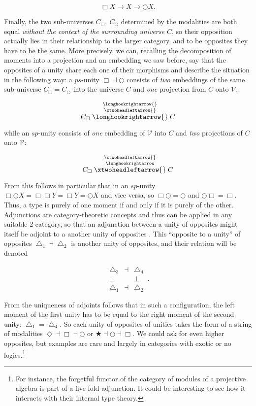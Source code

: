 \documentclass{article}
\begin{document}
$$\Box X\rightarrow X \rightarrow\bigcirc X.$$

Finally, the two sub-universes $C_\Box ,\ C_\bigcirc$ determined by the modalities are both equal \emph{without
the context of the surrounding universe $C$}, so their opposition actually lies in their relationship
to the larger category, and to be opposites they have to be the same. More precisely, we can, recalling
the decomposition of moments into a projection and an embedding we saw before, say that the opposites
of a unity share each one of their morphisms and describe the situation in the following way: a $ps$-unity
$\Box\dashv\bigcirc$ consists of \emph{two} embeddings of the same sub-universe $C_\Box=C_\bigcirc$ into
the universe $C$ and \emph{one} projection from $C$ onto $\mathcal{V}$:

$$C_\Box\stackrel{\longhookrightarrow{}}{\stackrel{\xtwoheadleftarrow{}}{\longhookrightarrow{}}}C$$

while an $sp$-unity consists of \emph{one} embedding of $\mathcal{V}$ into $C$ and \emph{two} projections
of $C$ onto $\mathcal{V}$:

$$C_\Box\stackrel{\xtwoheadleftarrow{}}{\stackrel{\longhookrightarrow}{\xtwoheadleftarrow{}}}C$$

From this follows in particular that in an $sp$-unity $\Box\bigcirc X=\Box\Box Y=\Box Y= \bigcirc X$ and
vice versa, so $\Box\bigcirc=\bigcirc$ and $\bigcirc\Box=\Box$. Thus, a type is purely of one moment if
and only if it is purely of the other. \\

Adjunctions are category-theoretic concepts and thus can be applied in any suitable 2-category, so that
an adjunction between a unity of opposites might itself be adjoint to a another unity of opposites \cite{Shu}.
This ``opposite to a unity'' of opposites $\bigtriangleup_1\dashv\bigtriangleup_2$ is another unity of
opposites, and their relation will be denoted 


$$
  \begin{array}{ccc}
    \bigtriangleup_3 &\dashv& \bigtriangleup_4
    \\
    \bot & & \bot
    \\
    \bigtriangleup_1 &\dashv& \bigtriangleup_2
    \end{array}
  \,.
$$

From the uniqueness of adjoints follows that in such a configuration, the left moment of the first unity
has to be equal to the right moment of the second unity: $\bigtriangleup_1=\bigtriangleup_4$. So each
unity of opposites of unities takes the form of a string of modalities $\Diamond\dashv\Box\dashv\bigcirc$
or $\bigstar\dashv\bigcirc\dashv\Box$. We could ask for even higher opposites, but examples are rare and
largely in categories with exotic or no logics.\footnote{For instance, the forgetful functor of the category
of modules of a projective algebra is part of a five-fold adjunction. It could be interesting to see how
it interacts with their internal type theory.} \\
\end{document}
